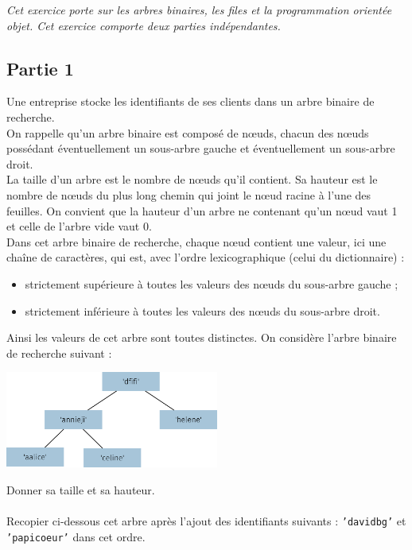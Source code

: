 \documentclass[a4paper,12pt,article,firamath]{nsi}
\begin{document}
\resetquestion
\textit{Cet exercice porte sur les arbres binaires, les files et la programmation orientée objet.
    Cet exercice comporte deux parties indépendantes.}\\

\subsection*{Partie 1}

Une entreprise stocke les identifiants de ses clients dans un arbre binaire de
recherche.\\
On rappelle qu'un arbre binaire est composé de nœuds, chacun des nœuds possédant
éventuellement un sous-arbre gauche et éventuellement un sous-arbre droit.\\
La taille d'un arbre est le nombre de nœuds qu'il contient. Sa hauteur est le nombre
de nœuds du plus long chemin qui joint le nœud racine à l'une des feuilles.
On convient que la hauteur d'un arbre ne contenant qu'un nœud vaut 1 et celle de
l'arbre vide vaut 0.\\
Dans cet arbre binaire de recherche, chaque nœud contient une valeur, ici une chaîne
de caractères, qui est, avec l'ordre lexicographique (celui du dictionnaire) :
\begin{itemize}
    \item strictement supérieure à toutes les valeurs des nœuds du sous-arbre gauche ;
    \item  strictement inférieure à toutes les valeurs des nœuds du sous-arbre droit.
\end{itemize}
Ainsi les valeurs de cet arbre sont toutes distinctes.
On considère l'arbre binaire de recherche suivant :
\begin{center}
    \includegraphics[width=7cm]{img/fig01.png}
\end{center}

\question Donner sa taille et sa hauteur.\\

\\

\question Recopier ci-dessous cet arbre après l'ajout des identifiants suivants : \texttt{'davidbg'}  et \texttt{'papicoeur'} dans cet ordre.\\
\end{document}

